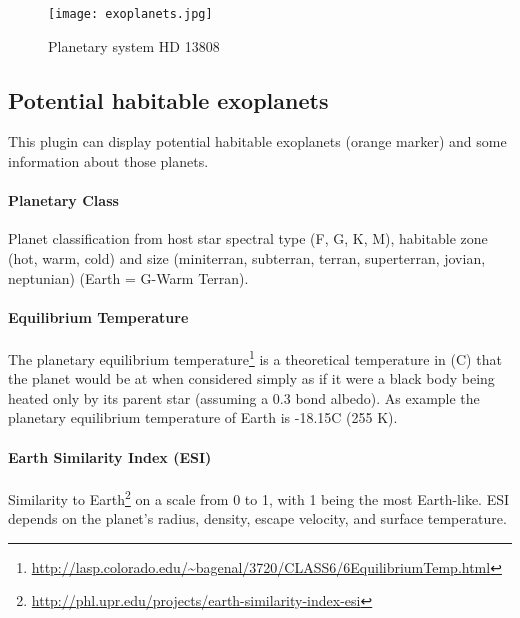 \begin{figure}[h]
\texttt{[image: exoplanets.jpg]}
\label{fig:Exoplanets}
\caption{Planetary system HD 13808}
\end{figure}

\subsection{Potential habitable exoplanets}
\label{sec:plugins:Exoplanets:habitable}
This plugin can display potential habitable exoplanets (orange marker) and some information about those planets.

\paragraph{Planetary Class}
Planet classification from host star spectral type (F, G, K, M), habitable zone (hot, warm, cold) and size (miniterran, subterran, terran, superterran, jovian, neptunian) (Earth = G-Warm Terran).

\paragraph{Equilibrium Temperature}
The planetary equilibrium temperature\footnote{\url{http://lasp.colorado.edu/~bagenal/3720/CLASS6/6EquilibriumTemp.html}} is a theoretical temperature in (\degree C) that the planet would be at when considered simply as if it were a black body being heated only by its parent star (assuming a 0.3 bond albedo). As example the planetary equilibrium temperature of Earth is -18.15\degree C (255 K).

\paragraph{Earth Similarity Index (ESI)}
Similarity to Earth\footnote{\url{http://phl.upr.edu/projects/earth-similarity-index-esi}} on a scale from 0 to 1, with 1 being the most Earth-like. ESI depends on the planet's radius, density, escape velocity, and surface temperature.

